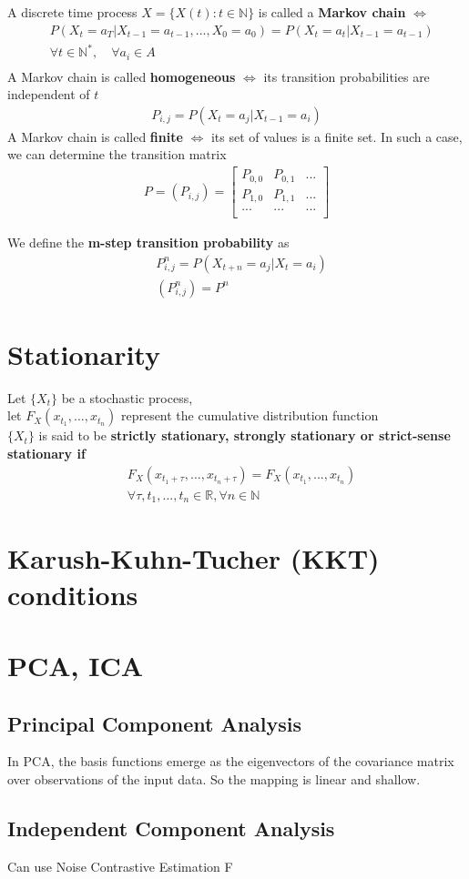 \documentclass[../main.tex]{subfiles}
\begin{document}
A discrete time process $X = \{X(t): t \in \mathbb{N}\}$ is called a \textbf{Markov chain}
$\Leftrightarrow$
\begin{align*}
    & P(X_t=a_T | X_{t-1} = a_{t-1}, ..., X_0 = a_0) = P(X_t = a_t | X_{t-1} = a_{t-1}) \\
    & \forall t \in \mathbb{N}^*, \quad \forall a_i \in A \\
\end{align*}
A Markov chain is called \textbf{homogeneous} $\Leftrightarrow$ its transition probabilities are
independent of $t$
\begin{align*}
    P_{i,j} = P(X_t = a_j | X_{t-1} = a_i)
\end{align*}
A Markov chain is called \textbf{finite} $\Leftrightarrow$ its set of values is a finite set.
In such a case, we can determine the transition matrix
\begin{align*}
    P = (P_{i, j}) =
    \begin{bmatrix}
        P_{0,0}  & P_{0,1} & ...\\
        P_{1, 0} & P_{1,1} & ...\\
        ...      & ...     & ...\\
    \end{bmatrix}
\end{align*}

We define the \textbf{m-step transition probability} as
\begin{align*}
    &P^n_{i,j} = P(X_{t+n} = a_j | X_{t} = a_i) \\
    &(P^n_{i, j}) = P^n
\end{align*}

\section{Stationarity}
Let $\{ X_t \}$ be a stochastic process, \\
let $F_X(x_{t_1}, ..., x_{t_n})$ represent the cumulative distribution function \\
$\{ X_t \}$ is said to be \textbf{strictly stationary, strongly stationary or strict-sense stationary if}
\begin{align*}
    &F_X(x_{t_1+\tau}, ..., x_{t_n+\tau}) = F_X(x_{t_1}, ..., x_{t_n}) \\
    &\forall \tau, t_1, ..., t_n \in \mathbb{R}, \forall n \in \mathbb{N}
\end{align*}

\section{Karush-Kuhn-Tucher (KKT) conditions}


\section{PCA, ICA}
\subsection{Principal Component Analysis}
In PCA, the basis functions emerge as the eigenvectors of the covariance matrix over observations of
the input data. So the mapping is linear and shallow.

\subsection{Independent Component Analysis}
Can use Noise Contrastive Estimation
F
\end{document}
